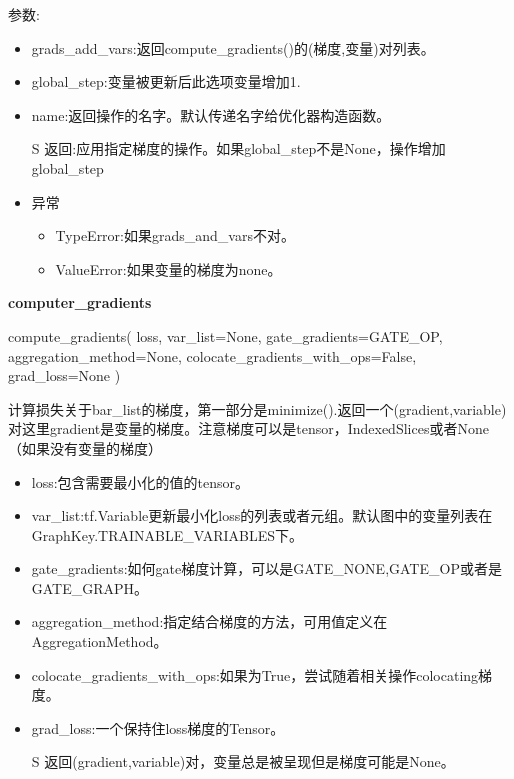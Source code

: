 参数:
\begin{itemize}
	\item grads\_add\_vars:返回compute\_gradients()的(梯度,变量)对列表。
	\item global\_step:变量被更新后此选项变量增加1.
	\item name:返回操作的名字。默认传递名字给优化器构造函数。
	\item [S] 返回:应用指定梯度的操作。如果global\_step不是None，操作增加global\_step
	\item 异常
	\begin{itemize}
		\item TypeError:如果grads\_and\_vars不对。
		\item ValueError:如果变量的梯度为none。
	\end{itemize}
\end{itemize}
\textbf{computer\_gradients}
\begin{python}
compute_gradients(
    loss,
    var_list=None,
    gate_gradients=GATE_OP,
    aggregation_method=None,
    colocate_gradients_with_ops=False,
    grad_loss=None
)
\end{python}
计算损失关于bar\_list的梯度，第一部分是minimize().返回一个(gradient,variable)对这里gradient是变量的梯度。注意梯度可以是tensor，IndexedSlices或者None（如果没有变量的梯度）
\begin{itemize}
	\item loss:包含需要最小化的值的tensor。
	\item var\_list:tf.Variable更新最小化loss的列表或者元组。默认图中的变量列表在GraphKey.TRAINABLE\_VARIABLES下。
	\item gate\_gradients:如何gate梯度计算，可以是GATE\_NONE,GATE\_OP或者是GATE\_GRAPH。
	\item aggregation\_method:指定结合梯度的方法，可用值定义在AggregationMethod。
	\item colocate\_gradients\_with\_ops:如果为True，尝试随着相关操作colocating梯度。
	\item grad\_loss:一个保持住loss梯度的Tensor。
	\item[S] 返回(gradient,variable)对，变量总是被呈现但是梯度可能是None。
\end{itemize}